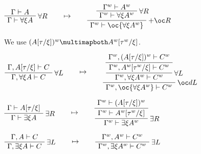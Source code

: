 \(\AxRule{\Gamma\vdash A}
\LabelRule{\forall R}
\UnaRule{\Gamma\vdash \forall\xi A}
\DisplayProof
\qquad\mapsto\qquad
\AxRule{\Gamma^w\vdash A^w}
\LabelRule{\forall R}
\UnaRule{\Gamma^w\vdash \forall\xi A^w}
\LabelRule{+ \oc R}
\UnaRule{\Gamma^w\vdash \oc{\forall\xi A^w}}
\DisplayProof\)

We use \((A[\tau/\xi])^w\linequiv A^w[\tau^w/\xi]\).

\(\AxRule{\Gamma,A[\tau/\xi]\vdash C}
\LabelRule{\forall L}
\UnaRule{\Gamma,\forall\xi A\vdash C}
\DisplayProof
\qquad\mapsto\qquad
\AxRule{\Gamma^w,(A[\tau/\xi])^w\vdash C^w}
\UnaRule{\Gamma^w,A^w[\tau^w/\xi]\vdash C^w}
\LabelRule{\forall L}
\UnaRule{\Gamma^w,\forall\xi A^w\vdash C^w}
\LabelRule{\oc d L}
\UnaRule{\Gamma^w,\oc{\forall\xi A^w}\vdash C^w}
\DisplayProof\)

\(\AxRule{\Gamma\vdash A[\tau/\xi]}
\LabelRule{\exists R}
\UnaRule{\Gamma\vdash \exists\xi A}
\DisplayProof
\qquad\mapsto\qquad
\AxRule{\Gamma^w\vdash (A[\tau/\xi])^w}
\UnaRule{\Gamma^w\vdash A^w[\tau^w/\xi]}
\LabelRule{\exists R}
\UnaRule{\Gamma^w\vdash \exists\xi A^w}
\DisplayProof\)

\(\AxRule{\Gamma,A\vdash C}
\LabelRule{\exists L}
\UnaRule{\Gamma,\exists\xi A\vdash C}
\DisplayProof
\qquad\mapsto\qquad
\AxRule{\Gamma^w,A^w\vdash C^w}
\LabelRule{\exists L}
\UnaRule{\Gamma^w,\exists\xi A^w\vdash C^w}
\DisplayProof\)



